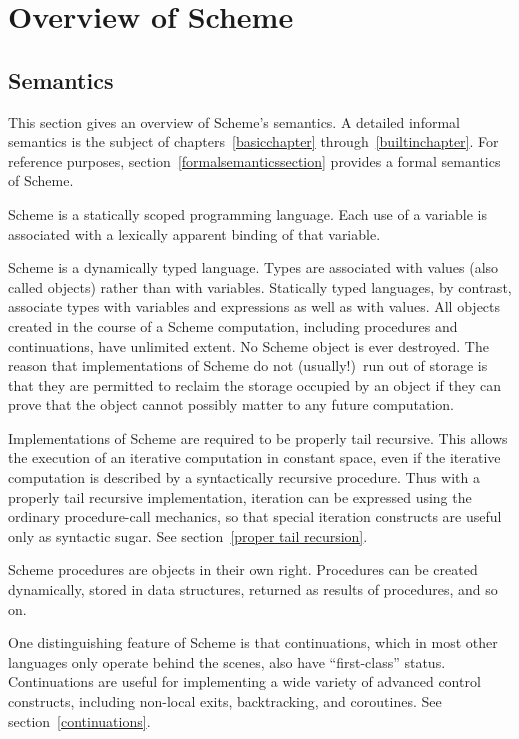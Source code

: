 
\chapter{Overview of Scheme}

\section{Semantics}
\label{semanticsection}

This section gives an overview of Scheme's semantics.  A
detailed informal semantics is the subject of
chapters~\ref{basicchapter} through~\ref{builtinchapter}.  For reference
purposes, section~\ref{formalsemanticssection} provides a formal
semantics of Scheme.

\vest Scheme is a statically scoped programming
language.  Each use of a variable is associated with a lexically
apparent binding of that variable.

\vest Scheme is a dynamically typed language.  Types
are associated with values (also called objects) rather than
with variables.  
Statically typed languages, by contrast, associate types with
variables and expressions as well as with values.
All objects created in the course of a Scheme computation, including
procedures and continuations, have unlimited extent.
No Scheme object is ever destroyed.  The reason that
implementations of Scheme do not (usually!)\ run out of storage is that
they are permitted to reclaim the storage occupied by an object if
they can prove that the object cannot possibly matter to any future
computation.  

\vest Implementations of Scheme are required to be properly tail recursive.
This allows the execution of an iterative computation in constant space,
even if the iterative computation is described by a syntactically
recursive procedure.  Thus with a properly tail recursive implementation,
iteration can be expressed using the ordinary procedure-call
mechanics, so that special iteration constructs are useful only as
syntactic sugar.  See section~\ref{proper tail recursion}.

\vest Scheme procedures are objects in their own right.  Procedures can be
created dynamically, stored in data structures, returned as results of
procedures, and so on.  

\vest One distinguishing feature of Scheme is that continuations, which
in most other languages only operate behind the scenes, also have
``first-class'' status.  Continuations are useful for implementing a
wide variety of advanced control constructs, including non-local exits,
backtracking, and coroutines.  See section~\ref{continuations}.

